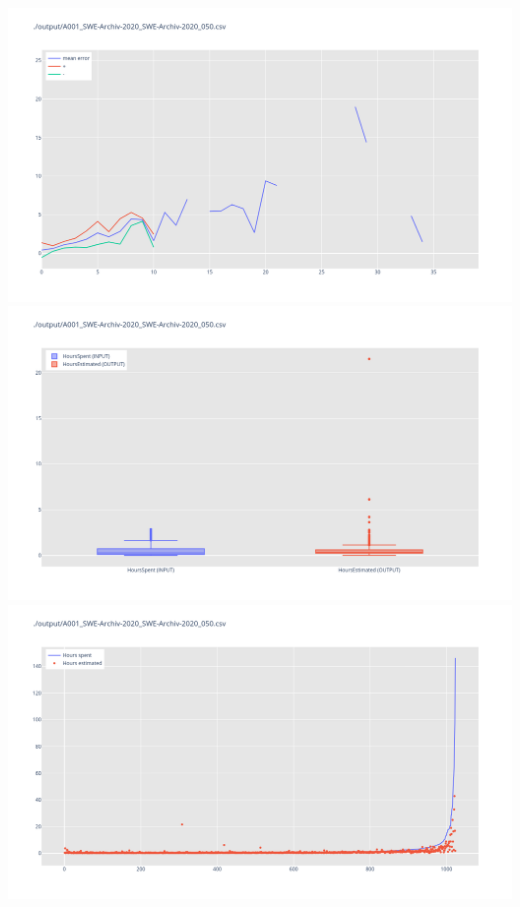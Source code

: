 \includegraphics[width=\textwidth]{Scripts/output/A001_SWE-Archiv-2020_SWE-Archiv-2020_050.csv.error_distribution.png}
\includegraphics[width=\textwidth]{Scripts/output/A001_SWE-Archiv-2020_SWE-Archiv-2020_050.csv.png}
\includegraphics[width=\textwidth]{Scripts/output/A001_SWE-Archiv-2020_SWE-Archiv-2020_050.csv.scatter.png}

